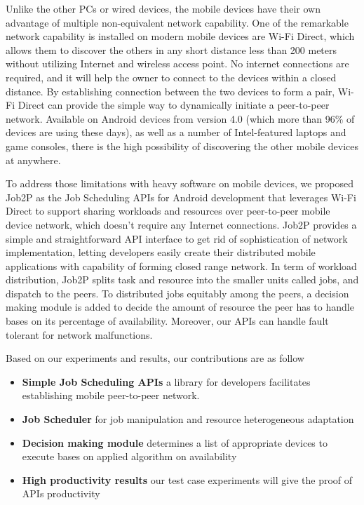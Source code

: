 \documentclass[conference]{IEEEtran}
\begin{document}
Unlike the other PCs or wired devices, the mobile devices have their own advantage of multiple non-equivalent network capability. One of the remarkable network capability is installed on modern mobile devices are Wi-Fi Direct, which allows them to discover the others in any short distance less than 200 meters without utilizing Internet and wireless access point. No internet connections are required, and it will help the owner to connect to the devices within a closed distance. By establishing connection between the two devices to form a pair, Wi-Fi Direct can provide the simple way to dynamically initiate a peer-to-peer network. Available on Android devices from version 4.0 (which more than 96\% of devices are using these days), as well as a number of Intel-featured laptops and game consoles, there is the high possibility of discovering the other mobile devices at anywhere.

To address those limitations with heavy software on mobile devices, we proposed Job2P as the Job Scheduling APIs for Android development that leverages Wi-Fi Direct to support sharing workloads and resources over peer-to-peer mobile device network, which doesn't require any Internet connections. Job2P provides a simple and straightforward API interface to get rid of sophistication of network implementation, letting developers easily create their distributed mobile applications with capability of forming closed range network. In term of workload distribution, Job2P splits task and resource into the smaller units called jobs, and dispatch to the peers. To distributed jobs equitably among the peers, a decision making module is added to decide the amount of resource the peer has to handle bases on its percentage of availability. Moreover, our APIs can handle fault tolerant for network malfunctions.

Based on our experiments and results, our contributions are as follow
\begin{itemize}
	\item \textbf{Simple Job Scheduling APIs} a library for developers facilitates establishing mobile peer-to-peer network.
	\item \textbf{Job Scheduler} for job manipulation and resource heterogeneous adaptation
	\item \textbf{Decision making module} determines a list of appropriate devices to execute bases on applied algorithm on availability
	\item \textbf{High productivity results} our test case experiments will give the proof of APIs productivity
\end{itemize}
 
\end{document}
